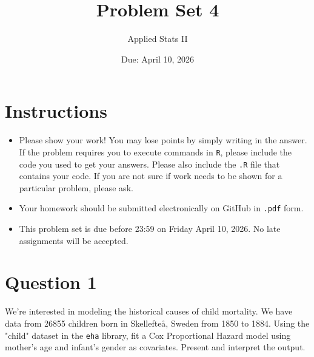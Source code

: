 \documentclass[12pt,letterpaper]{article}
\title{Problem Set 4}
\date{Due: April 10, 2026}
\author{Applied Stats II}
\begin{document}
	\maketitle
	\section*{Instructions}
	\begin{itemize}
	\item Please show your work! You may lose points by simply writing in the answer. If the problem requires you to execute commands in \texttt{R}, please include the code you used to get your answers. Please also include the \texttt{.R} file that contains your code. If you are not sure if work needs to be shown for a particular problem, please ask.
	\item Your homework should be submitted electronically on GitHub in \texttt{.pdf} form.
	\item This problem set is due before 23:59 on Friday April 10, 2026. No late assignments will be accepted.

	\end{itemize}

	\vspace{.25cm}
\section*{Question 1}
\vspace{.25cm}
\noindent We're interested in modeling the historical causes of child mortality. We have data from 26855 children born in Skellefteå, Sweden from 1850 to 1884. Using the "child" dataset in the \texttt{eha} library, fit a Cox Proportional Hazard model using mother's age and infant's gender as covariates. Present and interpret the output.

	 
	
\end{document}
